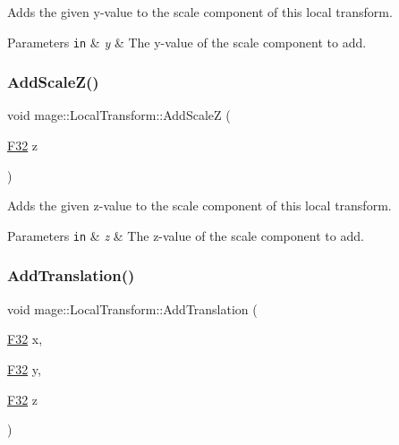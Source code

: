 Adds the given y-\/value to the scale component of this local transform.


\begin{DoxyParams}[1]{Parameters}
\mbox{\tt in}  & {\em y} & The y-\/value of the scale component to add. \\
\hline
\end{DoxyParams}
\mbox{\label{classmage_1_1_local_transform_a28160bebf308eec45d9649a197d91336}} 
\subsubsection{\texorpdfstring{Add\+Scale\+Z()}{AddScaleZ()}}
{\footnotesize\ttfamily void mage\+::\+Local\+Transform\+::\+Add\+ScaleZ (\begin{DoxyParamCaption}\item[{\mbox{\hyperlink{namespacemage_aa97e833b45f06d60a0a9c4fc22ae02c0}{F32}}}]{z }\end{DoxyParamCaption})\hspace{0.3cm}{\ttfamily [noexcept]}}

Adds the given z-\/value to the scale component of this local transform.


\begin{DoxyParams}[1]{Parameters}
\mbox{\tt in}  & {\em z} & The z-\/value of the scale component to add. \\
\hline
\end{DoxyParams}
\mbox{\label{classmage_1_1_local_transform_a2796d9726a59d5a3ea90beee25008222}} 
\subsubsection{\texorpdfstring{Add\+Translation()}{AddTranslation()}\hspace{0.1cm}{\footnotesize\ttfamily [1/3]}}
{\footnotesize\ttfamily void mage\+::\+Local\+Transform\+::\+Add\+Translation (\begin{DoxyParamCaption}\item[{\mbox{\hyperlink{namespacemage_aa97e833b45f06d60a0a9c4fc22ae02c0}{F32}}}]{x,  }\item[{\mbox{\hyperlink{namespacemage_aa97e833b45f06d60a0a9c4fc22ae02c0}{F32}}}]{y,  }\item[{\mbox{\hyperlink{namespacemage_aa97e833b45f06d60a0a9c4fc22ae02c0}{F32}}}]{z }\end{DoxyParamCaption})\hspace{0.3cm}{\ttfamily [noexcept]}}

